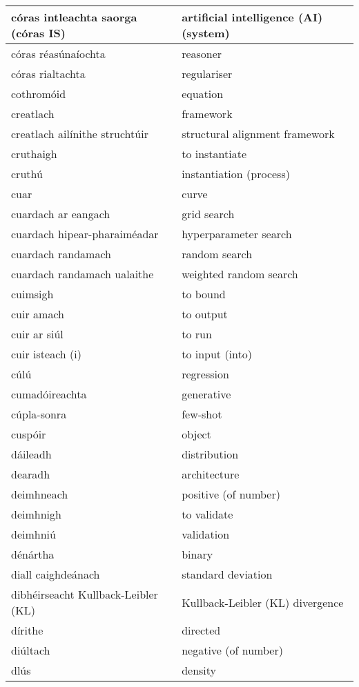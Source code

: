 \documentclass{article}
\begin{document}
\begin{longtable}{|l|l|}
		córas intleachta saorga (córas IS)&artificial intelligence (AI) (system)\\ \hline 
		córas réasúnaíochta&reasoner\\ \hline 
		córas rialtachta&regulariser\\ \hline 
		cothromóid&equation\\ \hline 
		creatlach&framework\\ \hline 
		creatlach ailínithe struchtúir&structural alignment framework\\ \hline 
		cruthaigh&to instantiate\\ \hline 
		cruthú&instantiation (process)\\ \hline 
		cuar&curve\\ \hline 
		cuardach ar eangach&grid search\\ \hline 
		cuardach hipear-pharaiméadar&hyperparameter search\\ \hline 
		cuardach randamach&random search\\ \hline 
		cuardach randamach ualaithe&weighted random search\\ \hline 
		cuimsigh&to bound\\ \hline 
		cuir amach&to output\\ \hline 
		cuir ar siúl&to run\\ \hline 
		cuir isteach (i)&to input (into)\\ \hline 
		cúlú&regression\\ \hline 
		cumadóireachta&generative\\ \hline 
		cúpla-sonra&few-shot\\ \hline 
		cuspóir&object\\ \hline 
		dáileadh&distribution\\ \hline 
		dearadh&architecture\\ \hline 
		deimhneach&positive (of number)\\ \hline 
		deimhnigh&to validate\\ \hline 
		deimhniú&validation\\ \hline 
		dénártha&binary\\ \hline 
		diall caighdeánach&standard deviation\\ \hline 
		dibhéirseacht Kullback-Leibler (KL)&Kullback-Leibler (KL) divergence\\ \hline 
		dírithe&directed\\ \hline 
		diúltach&negative (of number)\\ \hline 
		dlús&density\\ \hline 

\end{longtable}
\end{document}
